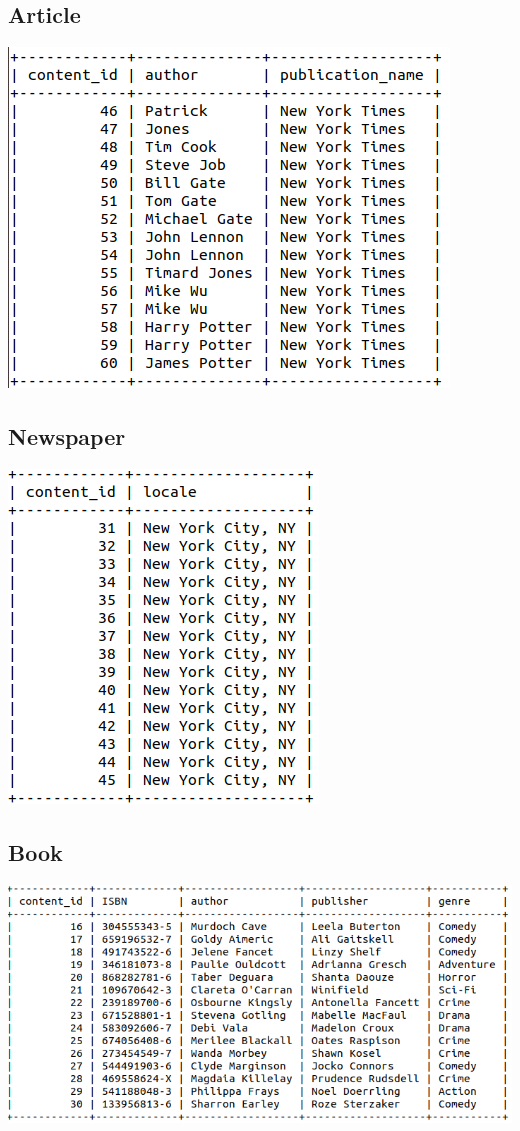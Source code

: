 \documentclass[letter, 12pt, titlepage]{article}
\begin{document}
		\subsection{Article}
			\includegraphics[scale=.5]{article.png}
		\subsection{Newspaper}
			\includegraphics[scale=.5]{newspaper.png}
		\subsection{Book}
			\includegraphics[scale=.5]{book.png}
\end{document}
